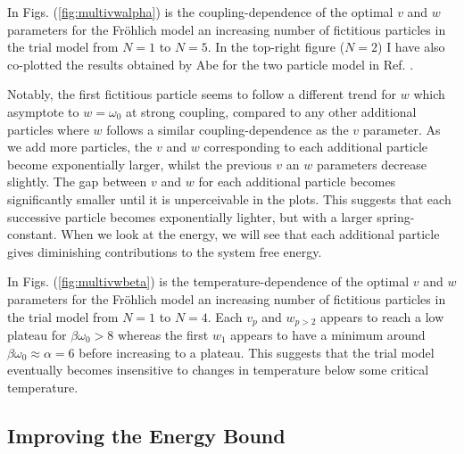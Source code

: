 In Figs. (\ref{fig:multivwalpha}) is the coupling-dependence of the optimal $v$ and $w$ parameters for the Fr\"ohlich model an increasing number of fictitious particles in the trial model from $N=1$ to $N=5$. In the top-right figure ($N=2$) I have also co-plotted the results obtained by Abe for the two particle model in Ref. \cite{Abe1971}. 
\newline

Notably, the first fictitious particle seems to follow a different trend for $w$ which asymptote to $w = \omega_0$ at strong coupling, compared to any other additional particles where $w$ follows a similar coupling-dependence as the $v$ parameter. As we add more particles, the $v$ and $w$ corresponding to each additional particle become exponentially larger, whilst the previous $v$ an $w$ parameters decrease slightly. The gap between $v$ and $w$ for each additional particle becomes significantly smaller until it is unperceivable in the plots. This suggests that each successive particle becomes exponentially lighter, but with a larger spring-constant. When we look at the energy, we will see that each additional particle gives diminishing contributions to the system free energy.
\newline

In Figs. (\ref{fig:multivwbeta}) is the temperature-dependence of the optimal $v$ and $w$ parameters for the Fr\"ohlich model an increasing number of fictitious particles in the trial model from $N=1$ to $N=4$. Each $v_p$ and $w_{p>2}$ appears to reach a low plateau for $\beta \omega_0 > 8$ whereas the first $w_1$ appears to have a minimum around $\beta\omega_0 \approx \alpha = 6$ before increasing to a plateau. This suggests that the trial model eventually becomes insensitive to changes in temperature below some critical temperature.

\subsection{Improving the Energy Bound}

